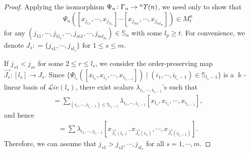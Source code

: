 \documentclass{amsart}
\theoremstyle{definition}
\theoremstyle{remark}
\numberwithin{equation}{section}
\def\S{\mathbb{S}}
\newcommand{\up}[1]{{^{#1}{\it \!\Upsilon}}}
\def\la{\lambda}
\def \Lie{\mathcal{L}ie}
\def \S{\mathbb{S}}
\begin{document}
\begin{proof}
	Applying the isomorphism $\Psi_n \colon \Gamma_n \to \up{n}(n)$, 
	we need only to show that 
	\[\Psi_n([x_{j_{11}}, \cdots, x_{j_{1l_1}}]\cdots 
	[x_{j_{m1}}, \cdots, x_{j_{ml_m}}])\in M_t^n\]
	for any $(j_{11}, \cdots, j_{1l_1}, \cdots, j_{m1}, 
	\cdots, j_{ml_m})\in \S_n$ with some $l_p\ge t$. For convenience, 
	we denote $J_s\colon =\{j_{s1}, \cdots, j_{s l_s}\}$ for 
	$1\le s\le m$.
	
	If $j_{s1}<j_{sr}$ for some $2\le r\le l_s$, we consider the 
	order-preserving map $\overrightarrow{J_s}\colon [l_s]\to J_s$. 
	Since $\{\Psi_{l_s}([x_{l_s}, x_{i_1}, \cdots, x_{i_{l_s-1}}])
	\mid (i_1, \cdots, i_{l_s-1})\in \S_{l_{s}-1}\}$ is a 
	$\Bbbk$-linear basis of $\Lie(l_s)$, there exist scalars 
	$\la_{i_1, \cdots, i_{l_s-1}}$'s such that 
	\begin{align*}
		[x_{\overrightarrow{J_s}^{-1}(j_{s1})}, \cdots, 
		x_{\overrightarrow{J_s}^{-1}(j_{sl_{s}})}]
		=\sum_{(i_1, \cdots, i_{l_s-1})\in \S_{l_{s}-1}}
		\la_{i_1, \cdots, i_{l_s-1}} [x_{l_s}, x_{i_1}, 
		\cdots, x_{i_{l_s-1}}],
	\end{align*}
	and hence 
	\begin{align*}
		[x_{j_{s1}}, \cdots, x_{j_{sl_{s}}}]
		=\sum\la_{i_1, \cdots, i_{l_s-1}} 
		[x_{\overrightarrow{J_s}(l_s)}, x_{\overrightarrow{J_s}(i_1)}, 
		\cdots, x_{\overrightarrow{J_s}(i_{l_s-1})}].
	\end{align*}
	Therefore, we can assume that $j_{s1}>j_{s2}, \cdots, j_{sl_s}$ 
	for all $s=1, \cdots, m$. 
	

\end{proof}
\end{document}
